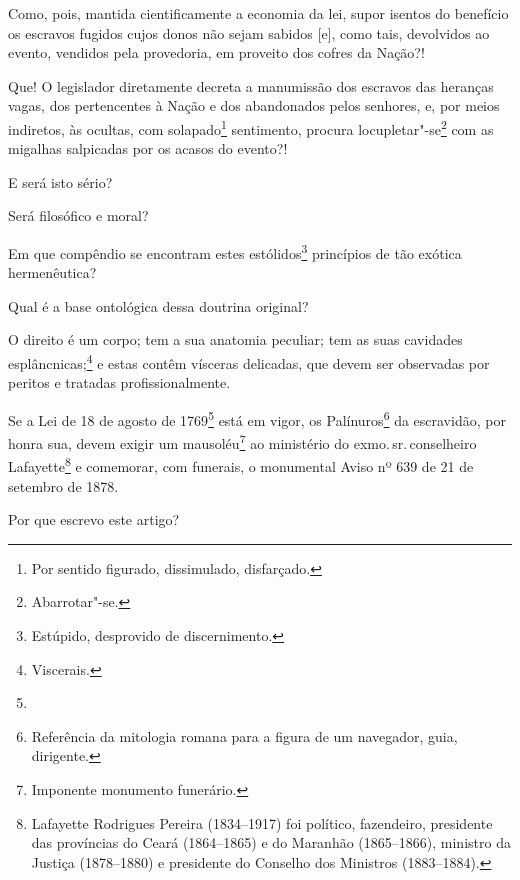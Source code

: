 Como, pois, mantida cientificamente a economia da lei, supor isentos do
benefício os escravos fugidos cujos donos não sejam sabidos {[}e{]},
como tais, devolvidos ao evento, vendidos pela provedoria, em proveito
dos cofres da Nação?!

Que! O legislador diretamente decreta a manumissão dos escravos das
heranças vagas, dos pertencentes à Nação e dos abandonados pelos
senhores, e, por meios indiretos, às ocultas, com solapado\footnote{
  Por sentido figurado, dissimulado, disfarçado.} sentimento, procura
locupletar"-se\footnote{Abarrotar"-se.} com as migalhas salpicadas por
os acasos do evento?!

E será isto sério?

Será filosófico e moral?

Em que compêndio se encontram estes estólidos\footnote{Estúpido,
  desprovido de discernimento.} princípios de tão exótica hermenêutica?

Qual é a base ontológica dessa doutrina original?

O direito é um corpo; tem a sua anatomia peculiar; tem as suas cavidades
esplâncnicas;\footnote{Viscerais.} e estas contêm vísceras delicadas,
que devem ser observadas por peritos e tratadas profissionalmente.

Se a Lei de 18 de agosto de 1769\footnote{} está em vigor, os
Palínuros\footnote{Referência da mitologia romana para a figura de um
  navegador, guia, dirigente.} da escravidão, por honra sua, devem
exigir um mausoléu\footnote{Imponente monumento funerário.} ao
ministério do exmo.\,sr.\,conselheiro Lafayette\footnote{Lafayette
  Rodrigues Pereira (1834--1917) foi político, fazendeiro, presidente
  das províncias do Ceará (1864--1865) e do Maranhão (1865--1866),
  ministro da Justiça (1878--1880) e presidente do Conselho dos Ministros
  (1883--1884).} e comemorar, com funerais, o monumental Aviso nº 639 de
21 de setembro de 1878.

\asterisc

Por que escrevo este artigo?

